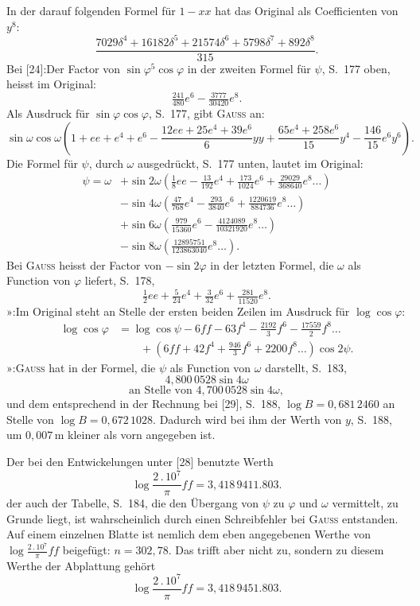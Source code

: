 {\small
\noindent In der darauf folgenden Formel für \(1-xx\) hat das Original als Coefficienten von \(y^8\):
\[
\frac{7029\delta^4+16182\delta^5+21574\delta^6+5798\delta^7+892\delta^8}{315}.
\]
\noindent Bei [24]:\quad Der Factor von \(\sin\varphi^5\cos\varphi\) in der zweiten Formel
für \(\psi\), S.\ 177 oben, heisst im Original:
\[
\tfrac{241}{480}e^6-\tfrac{3777}{30420}e^8.
\]
\noindent Als Ausdruck für \(\sin\varphi\cos\varphi\), S.\ 177, gibt \textsc{Gauss} an:
\[
\sin\omega\cos\omega\left(1+ee+e^4+e^6-\frac{12ee+25e^4+39e^6}{6}yy
+\frac{65e^4+258e^6}{15}y^4-\frac{146}{15}e^6y^6\right).
\]
\noindent Die Formel für \(\psi\), durch \(\omega\) ausgedrückt, S.\ 177 unten, lautet im Original:
\[
\begin{aligned}
\psi=\omega&+\sin2\omega\left(\frac18ee-\frac{13}{192}e^4+\frac{173}{1024}e^6
+\frac{29029}{368640}e^8\ldots\right)\\
&-\sin4\omega\left(\frac{47}{768}e^4-\frac{293}{3840}e^6+\frac{1220619}{884736}e^8\ldots\right)\\
&+\sin6\omega\left(\frac{979}{15360}e^6-\frac{4124089}{10321920}e^8\ldots\right)\\
&-\sin8\omega\left(\frac{12895751}{123863040}e^8\ldots\right).
\end{aligned}
\]
\noindent Bei \textsc{Gauss} heisst der Factor von \(-\sin2\varphi\) in der letzten Formel,
die \(\omega\) als Function von \(\varphi\) liefert, S.\ 178,
\[
\tfrac12ee+\tfrac5{24}e^4+\tfrac3{32}e^6+\tfrac{281}{11520}e^8.
\]
\noindent »\quad [26]:\quad Im Original steht an Stelle der ersten beiden Zeilen im Ausdruck
für \(\log\cos\varphi\):
\[
\begin{aligned}
\log\cos\varphi&=\log\cos\psi-6ff-63f^4-\frac{2192}3f^6-\frac{17559}2f^8\ldots\\
&\qquad+\left(6ff+42f^4+\frac{946}3f^6+2200f^8\ldots\right)\cos2\psi.
\end{aligned}
\]
\noindent »\quad [28]:\quad \textsc{Gauss} hat in der Formel, die \(\psi\) als Function
von \(\omega\) darstellt, S.\ 183,
\[
4{,}800\,0528\sin4\omega
\]
\[
\text{an Stelle von }4{,}700\,0528\sin4\omega,
\]
\noindent und dem entsprechend in der Rechnung bei [29], S.\ 188,
\(\log B=0{,}681\,2460\) an Stelle von \(\log B=0{,}672\,1028\). Dadurch wird bei ihm
der Werth von \(y\), S.\ 188, um \(0{,}007\,\mathrm m\) kleiner als vorn angegeben ist.

\noindent Der bei den Entwickelungen unter [28] benutzte Werth
\[
\log\frac{2\,.\,10^7}{\pi}ff=3{,}418\,9411.803.
\]
\noindent der auch der Tabelle, S.\ 184, die den Übergang von \(\psi\) zu \(\varphi\)
und \(\omega\) vermittelt, zu Grunde liegt, ist wahrscheinlich durch einen Schreibfehler
bei \textsc{Gauss} entstanden. Auf einem einzelnen Blatte ist nemlich dem eben
angegebenen Werthe von \(\log\frac{2\,.\,10^7}{\pi}ff\) beigefügt: \(n=302{,}78\).
Das trifft aber nicht zu, sondern zu diesem Werthe der Abplattung gehört
\[
\log\frac{2\,.\,10^7}{\pi}ff=3{,}418\,9451.803.
\]
\par}

